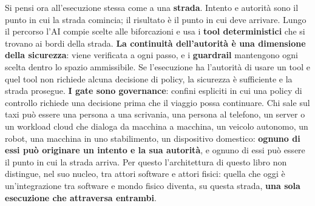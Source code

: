 \documentclass[10pt,oneside,openany]{book}
\begin{document}
{\begin{center}
\end{center}

Si pensi ora all'esecuzione stessa come a una \textbf{strada}. Intento e autorità sono il punto in cui la strada comincia; il risultato è il punto in cui deve arrivare. Lungo il percorso l'AI compie scelte alle biforcazioni e usa i \textbf{tool deterministici} che si trovano ai bordi della strada. \textbf{La continuità dell'autorità è una dimensione della sicurezza}: viene verificata a ogni passo, e i \textbf{guardrail} mantengono ogni scelta dentro lo spazio ammissibile. Se l'esecuzione ha l'autorità di usare un tool e quel tool non richiede alcuna decisione di policy, la sicurezza è sufficiente e la strada prosegue. \textbf{I gate sono governance}: confini espliciti in cui una policy di controllo richiede una decisione prima che il viaggio possa continuare. Chi sale sul taxi può essere una persona a una scrivania, una persona al telefono, un server o un workload cloud che dialoga da macchina a macchina, un veicolo autonomo, un robot, una macchina in uno stabilimento, un dispositivo domestico: \textbf{ognuno di essi può originare un intento e la sua autorità}, e ognuno di essi può essere il punto in cui la strada arriva. Per questo l'architettura di questo libro non distingue, nel suo nucleo, tra attori software e attori fisici: quella che oggi è un'integrazione tra software e mondo fisico diventa, su questa strada, \textbf{una sola esecuzione che attraversa entrambi}.

}
\end{document}

